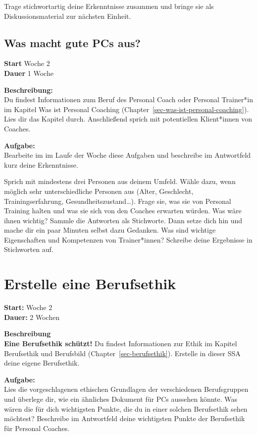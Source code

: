 \documentclass[
  letterpaper,
  DIV=11,
  numbers=noendperiod]{scrreprt}
\begin{document}
Trage stichwortartig deine Erkenntnisse zusammen und bringe sie als
Diskussionsmaterial zur nächsten Einheit.

\subsection{Was macht gute PCs aus?}\label{was-macht-gute-pcs-aus}

\textbf{Start} Woche 2\\
\textbf{Dauer} 1 Woche

\textbf{Beschreibung:}\\
Du findest Informationen zum Beruf des Personal Coach oder Personal
Trainer*in im Kapitel Was ist Personal Coaching
(Chapter~\ref{sec-was-ist-personal-coaching}). Lies dir das Kapitel
durch. Anschließend sprich mit potentiellen Klient*innen von Coaches.

\textbf{Aufgabe:}\\
Bearbeite im im Laufe der Woche diese Aufgaben und beschreibe im
Antwortfeld kurz deine Erkenntnisse.

Sprich mit mindestens drei Personen aus deinem Umfeld. Wähle dazu, wenn
möglich sehr unterschiedliche Personen aus (Alter, Geschlecht,
Trainingserfahrung, Gesundheitszustand\ldots). Frage sie, was sie von
Personal Training halten und was sie sich von den Coaches erwarten
würden. Was wäre ihnen wichtig? Sammle die Antworten als Stichworte.
Dann setze dich hin und mache dir ein paar Minuten selbst dazu Gedanken.
Was sind wichtige Eigenschaften und Kompetenzen von Trainer*innen?
Schreibe deine Ergebnisse in Stichworten auf.

\section{Erstelle eine Berufsethik}\label{erstelle-eine-berufsethik}

\textbf{Start:} Woche 2\\
\textbf{Dauer:} 2 Wochen

\textbf{Beschreibung}\\
\textbf{Eine Berufsethik schützt!} Du findest Informationen zur Ethik im
Kapitel Berufsethik und Berufsbild (Chapter~\ref{sec-berufsethik}).
Erstelle in dieser SSA deine eigene Berufsethik.

\textbf{Aufgabe:}\\
Lies die vorgeschlagenen ethischen Grundlagen der verschiedenen
Berufsgruppen und überlege dir, wie ein ähnliches Dokument für PCs
aussehen könnte. Was wären die für dich wichtigsten Punkte, die du in
einer solchen Berufsethik sehen möchtest? Beschreibe im Antwortfeld
deine wichtigsten Punkte der Berufsethik für Personal Coaches.
\end{document}
